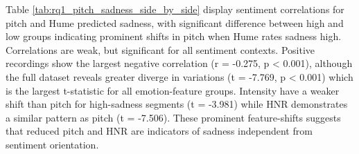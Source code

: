   Table \ref{tab:rq1_pitch_sadness_side_by_side} display sentiment correlations for pitch and Hume predicted sadness, with significant difference between high and low groups indicating prominent shifts in pitch when Hume rates sadness high. 
  Correlations are weak, but significant for all sentiment contexts. Positive recordings show the largest negative correlation (r = -0.275, p < 0.001), although the full dataset reveals greater diverge in variations (t = -7.769, p < 0.001) which is the 
  largest t-statistic for all emotion-feature groups. Intensity have a weaker shift than pitch for high-sadness segments (t = -3.981) while HNR demonstrates a similar pattern as pitch (t = -7.506). 
  These prominent feature-shifts suggests that reduced pitch and HNR are indicators of sadness independent from sentiment orientation.
  
  

